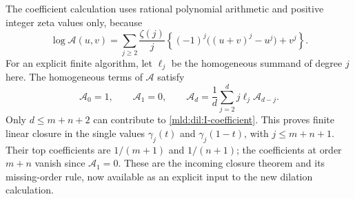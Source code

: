 The coefficient calculation uses rational polynomial arithmetic and
positive integer zeta values only, because
\begin{equation}
 \log\mathcal A(u,v)=\sum_{j\ge2}\frac{\zeta(j)}j
       \left\{(-1)^j\bigl((u+v)^j-u^j\bigr)+v^j\right\}.
 \label{mld:dil:logA}
\end{equation}
For an explicit finite algorithm, let $\ell_j$ be the homogeneous summand
of degree $j$ here. The homogeneous terms of $\mathcal A$ satisfy
\[
 \mathcal A_0=1,\qquad\mathcal A_1=0,\qquad
 \mathcal A_d=\frac1d\sum_{j=2}^d j\ell_j\mathcal A_{d-j}.
\]
Only $d\le m+n+2$ can contribute to \eqref{mld:dil:I-coefficient}. This proves
finite linear closure in the single values $\gamma_j(t)$ and
$\gamma_j(1-t)$, with $j\le m+n+1$. Their top coefficients are
$1/(m+1)$ and $1/(n+1)$; the coefficients at order $m+n$ vanish since
$\mathcal A_1=0$. These are the incoming closure theorem and its
missing-order rule, now available as an explicit input to the new
dilation calculation.
